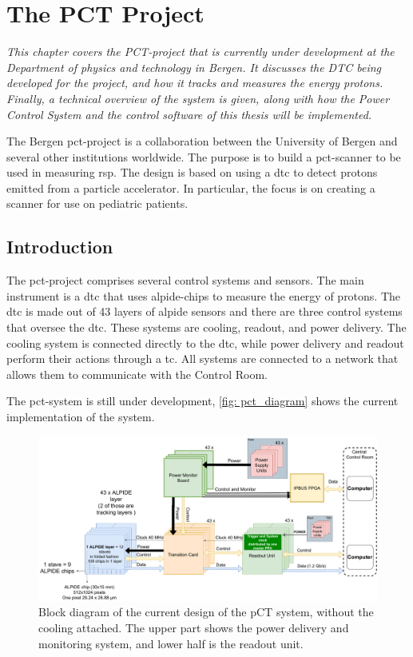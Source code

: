 \documentclass[main.tex]{subfiles}
\begin{document}
\section{The PCT Project}
\textit{This chapter covers the PCT-project that is currently under development at the Department of physics and technology in Bergen. It discusses the DTC being developed for the project, and how it tracks and measures the energy protons. Finally, a technical overview of the system is given, along with how the Power Control System and the control software of this thesis will be implemented.}

The Bergen \gls{pct}-project is a collaboration between the University of Bergen and several other institutions worldwide. The purpose is to build a \gls{pct}-scanner to be used in measuring \gls{rsp}. The design is based on using a \acrlong{dtc} to detect protons emitted from a particle accelerator. In particular, the focus is on creating a scanner for use on pediatric patients.


\subsection{Introduction}

The \gls{pct}-project comprises several control systems and sensors. The main instrument is a \gls{dtc} that uses \gls{alpide}-chips to measure the energy of protons. The \gls{dtc} is made out of 43 layers of \gls{alpide} sensors and there are three control systems that oversee the \gls{dtc}. These systems are cooling, readout, and power delivery. The cooling system is connected directly to the \gls{dtc}, while power delivery and readout perform their actions through a \gls{tc}. All systems are connected to a network that allows them to communicate with the Control Room.

The \gls{pct}-system is still under development, \autoref{fig: pct_diagram} shows the current implementation of the system.

\begin{figure}[!ht]
    \centering
    \includegraphics[scale=0.4]{images/pCT_Current_layout-CurrentSystemOverview.pdf}
    \caption{Block diagram of the current design of the pCT system, without the cooling attached. The upper part shows the power delivery and monitoring system, and lower half is the readout unit.}
    \label{fig: pct_diagram}
\end{figure}
\FloatBarrier
\end{document}
